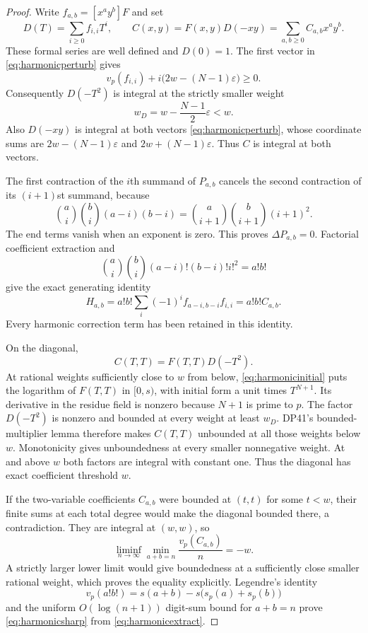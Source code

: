 \documentclass[11pt,a4paper]{article}
\theoremstyle{definition}\newtheorem{remark}[theorem]{Remark}
\newcommand{\vp}{v_p}\newcommand{\dR}{\mathrm{dR}}\newcommand{\crys}{\mathrm{crys}}
\begin{document}
\begin{proof}
Write $f_{a,b}=[x^ay^b]F$ and set
\[
 D(T)=\sum_{i\ge0}f_{i,i}T^i,\qquad
 C(x,y)=F(x,y)D(-xy)=\sum_{a,b\ge0}C_{a,b}x^ay^b.
\]
These formal series are well defined and $D(0)=1$.
The first vector in \eqref{eq:harmonicperturb} gives
\[
 \vp(f_{i,i})+i\bigl(2w-(N-1)\varepsilon\bigr)\ge0.
\]
Consequently $D(-T^2)$ is integral at the strictly smaller weight
\[
 w_D=w-\frac{N-1}{2}\varepsilon<w.
\]
Also $D(-xy)$ is integral at both vectors \eqref{eq:harmonicperturb}, whose coordinate sums are
$2w-(N-1)\varepsilon$ and $2w+(N-1)\varepsilon$.
Thus $C$ is integral at both vectors.

The first contraction of the $i$th summand of $P_{a,b}$ cancels the second contraction of its $(i+1)$st summand, because
\[
 \binom ai\binom bi(a-i)(b-i)
 =\binom a{i+1}\binom b{i+1}(i+1)^2.
\]
The end terms vanish when an exponent is zero.
This proves $\Delta P_{a,b}=0$.
Factorial coefficient extraction and
\[
 \binom ai\binom bi(a-i)!(b-i)!i!^2=a!b!
\]
give the exact generating identity
\begin{equation}\label{eq:harmonicextract}
 H_{a,b}=a!b!\sum_i(-1)^if_{a-i,b-i}f_{i,i}
         =a!b!C_{a,b}.
\end{equation}
Every harmonic correction term has been retained in this identity.

On the diagonal,
\[
 C(T,T)=F(T,T)D(-T^2).
\]
At rational weights sufficiently close to $w$ from below,
\eqref{eq:harmonicinitial} puts the logarithm of $F(T,T)$ in $[0,s)$, with initial form a unit times $T^{N+1}$.
Its derivative in the residue field is nonzero because $N+1$ is prime to $p$.
The factor $D(-T^2)$ is nonzero and bounded at every weight at least $w_D$.
DP41's bounded-multiplier lemma therefore makes $C(T,T)$ unbounded at all those weights below $w$.
Monotonicity gives unboundedness at every smaller nonnegative weight.
At and above $w$ both factors are integral with constant one.
Thus the diagonal has exact coefficient threshold $w$.

If the two-variable coefficients $C_{a,b}$ were bounded at $(t,t)$ for some $t<w$, their finite sums at each total degree would make the diagonal bounded there, a contradiction.
They are integral at $(w,w)$, so
\[
 \liminf_{n\to\infty}\min_{a+b=n}\frac{\vp(C_{a,b})}{n}=-w.
\]
A strictly larger lower limit would give boundedness at a sufficiently close smaller rational weight, which proves the equality explicitly.
Legendre's identity
\[
 \vp(a!b!)=s(a+b)-s\bigl(s_p(a)+s_p(b)\bigr)
\]
and the uniform $O(\log(n+1))$ digit-sum bound for $a+b=n$ prove
\eqref{eq:harmonicsharp} from \eqref{eq:harmonicextract}.


\end{proof}
\end{document}
